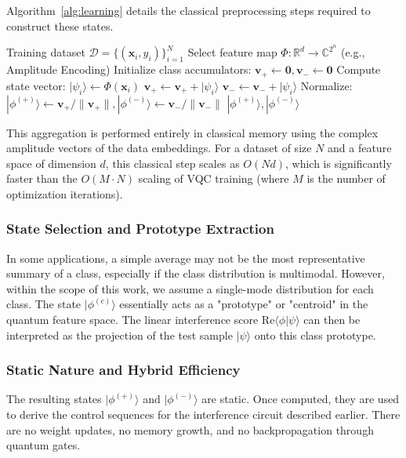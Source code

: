 \documentclass[conference]{IEEEtran}
\begin{document}
Algorithm~\ref{alg:learning} details the classical preprocessing steps required to construct these states.

\begin{algorithm}[ht]
\caption{Static Learning of Class-Representative States}
\label{alg:learning}
\begin{algorithmic}[1]
\REQUIRE Training dataset $\mathcal{D} = \{(\mathbf{x}_i, y_i)\}_{i=1}^N$
\STATE Select feature map $\Phi: \mathbb{R}^d \rightarrow \mathbb{C}^{2^n}$ (e.g., Amplitude Encoding)
\STATE Initialize class accumulators: $\mathbf{v}_+ \leftarrow \mathbf{0}, \mathbf{v}_- \leftarrow \mathbf{0}$
    \STATE Compute state vector: $|\psi_i\rangle \leftarrow \Phi(\mathbf{x}_i)$
        \STATE $\mathbf{v}_+ \leftarrow \mathbf{v}_+ + |\psi_i\rangle$
    \ELSE
        \STATE $\mathbf{v}_- \leftarrow \mathbf{v}_- + |\psi_i\rangle$
    \ENDIF
\ENDFOR
\STATE Normalize: $|\phi^{(+)}\rangle \leftarrow \mathbf{v}_+/\|\mathbf{v}_+\|, |\phi^{(-)}\rangle \leftarrow \mathbf{v}_-/\|\mathbf{v}_-\|$
\RETURN $|\phi^{(+)}\rangle, |\phi^{(-)}\rangle$
\end{algorithmic}
\end{algorithm}

This aggregation is performed entirely in classical memory using the complex amplitude vectors of the data embeddings. For a dataset of size $N$ and a feature space of dimension $d$, this classical step scales as $O(Nd)$, which is significantly faster than the $O(M \cdot N)$ scaling of VQC training (where $M$ is the number of optimization iterations).

\subsubsection{State Selection and Prototype Extraction}
In some applications, a simple average may not be the most representative summary of a class, especially if the class distribution is multimodal. However, within the scope of this work, we assume a single-mode distribution for each class. The state $|\phi^{(c)}\rangle$ essentially acts as a "prototype" or "centroid" in the quantum feature space. The linear interference score $\text{Re}\langle \phi | \psi \rangle$ can then be interpreted as the projection of the test sample $|\psi\rangle$ onto this class prototype.

\subsubsection{Static Nature and Hybrid Efficiency}
The resulting states $|\phi^{(+)}\rangle$ and $|\phi^{(-)}\rangle$ are static. Once computed, they are used to derive the control sequences for the interference circuit described earlier. There are no weight updates, no memory growth, and no backpropagation through quantum gates.
\end{document}
